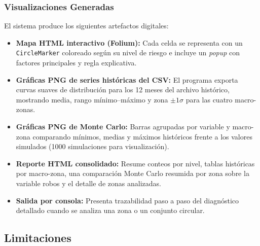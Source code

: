 \documentclass[11pt]{article}
\begin{document}
\subsubsection{Visualizaciones Generadas}

El sistema produce los siguientes artefactos digitales:

\begin{itemize}
    \item \textbf{Mapa HTML interactivo (Folium):} Cada celda se representa con un \texttt{CircleMarker} coloreado según su nivel de riesgo e incluye un \textit{popup} con factores principales y regla explicativa.
    \item \textbf{Gráficas PNG de series históricas del CSV:} El programa exporta curvas suaves de distribución para los 12 meses del archivo histórico, mostrando media, rango mínimo--máximo y zona $\pm 1\sigma$ para las cuatro macro-zonas.
    \item \textbf{Gráficas PNG de Monte Carlo:} Barras agrupadas por variable y macro-zona comparando mínimos, medias y máximos históricos frente a los valores simulados (1000 simulaciones para visualización).
    \item \textbf{Reporte HTML consolidado:} Resume conteos por nivel, tablas históricas por macro-zona, una comparación Monte Carlo resumida por zona sobre la variable robos y el detalle de zonas analizadas.
    \item \textbf{Salida por consola:} Presenta trazabilidad paso a paso del diagnóstico detallado cuando se analiza una zona o un conjunto circular.
\end{itemize}

\subsection{Limitaciones}
\end{document}
